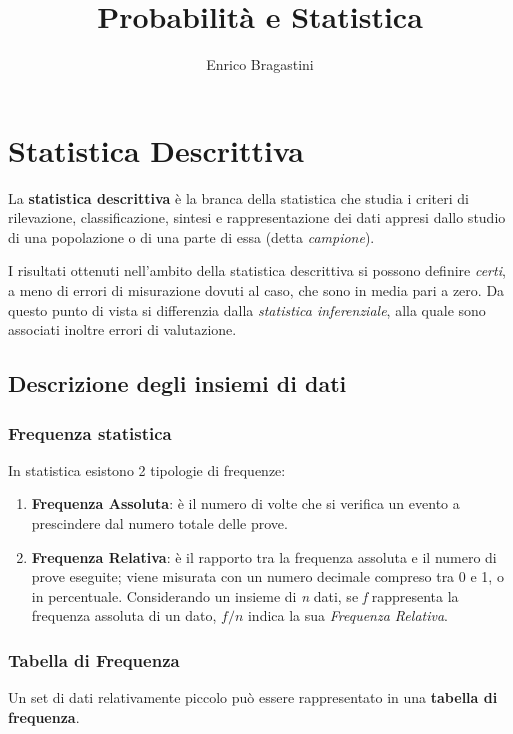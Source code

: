 \documentclass[11pt,oneside,draft]{book}
\title{\Large{\textbf{Probabilità e Statistica}}}
\author{Enrico Bragastini}
\begin{document}
\pagestyle{fancy}
\fancyhf{}
\rhead{}
\lhead{\nouppercase\leftmark}
\cfoot{\thepage}
\frontmatter

\maketitle
\tableofcontents

\mainmatter

\chapter{Statistica Descrittiva}
La \textbf{statistica descrittiva} è la branca della statistica che studia i criteri di rilevazione,
classificazione, sintesi e rappresentazione dei dati appresi dallo studio di una popolazione o di
una parte di essa (detta \textit{campione}).

I risultati ottenuti nell'ambito della statistica descrittiva si possono definire \emph{certi}, a meno di errori
di misurazione dovuti al caso, che sono in media pari a zero. Da questo punto di vista si differenzia dalla \emph{statistica inferenziale}, alla quale sono associati inoltre errori di valutazione.

\section{Descrizione degli insiemi di dati}
\subsection{Frequenza statistica}
In statistica esistono 2 tipologie di frequenze:
\begin{enumerate}
    \item \textbf{Frequenza Assoluta}: è il numero di volte che si verifica un evento a prescindere dal numero totale delle prove.
    \item \textbf{Frequenza Relativa}: è il rapporto tra la frequenza assoluta e il numero di prove eseguite; viene misurata con un numero decimale compreso tra 0 e 1, o in percentuale.
          Considerando un insieme di \emph{n} dati, se \emph{f} rappresenta la frequenza assoluta di un dato, $f/n$ indica la sua \emph{Frequenza Relativa}.
\end{enumerate}

\subsection{Tabella di Frequenza}
Un set di dati relativamente piccolo può essere rappresentato in una \textbf{tabella di frequenza}.
\end{document}
